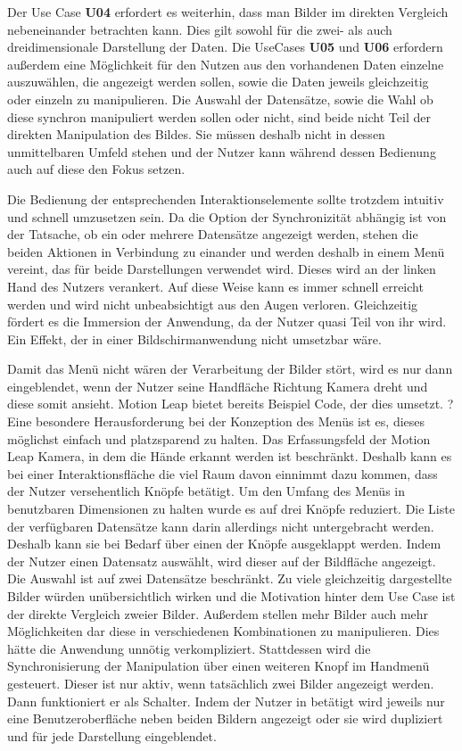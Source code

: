 Der Use Case \textbf{U04} erfordert es weiterhin, dass man Bilder im direkten Vergleich nebeneinander betrachten kann. Dies gilt sowohl für die zwei- als auch dreidimensionale Darstellung der Daten. Die UseCases \textbf{U05} und \textbf{U06} erfordern außerdem eine Möglichkeit für den Nutzen aus den vorhandenen Daten einzelne auszuwählen, die angezeigt werden sollen, sowie die Daten jeweils gleichzeitig oder einzeln zu manipulieren. 
Die Auswahl der Datensätze, sowie die Wahl ob diese synchron manipuliert werden sollen oder nicht, sind beide nicht Teil der direkten Manipulation des Bildes. Sie müssen deshalb nicht in dessen unmittelbaren Umfeld stehen und der Nutzer kann während dessen Bedienung auch auf diese den Fokus setzen.
 
Die Bedienung der entsprechenden Interaktionselemente sollte trotzdem intuitiv und schnell umzusetzen sein. Da die Option der Synchronizität abhängig ist von der Tatsache, ob ein oder mehrere Datensätze angezeigt werden, stehen die beiden Aktionen in Verbindung zu einander und werden deshalb in einem Menü vereint, das für beide Darstellungen verwendet wird. Dieses wird an der linken Hand des Nutzers verankert. Auf diese Weise kann es immer schnell erreicht werden und wird nicht unbeabsichtigt aus den Augen verloren. Gleichzeitig fördert es die Immersion der Anwendung, da der Nutzer quasi Teil von ihr wird. Ein Effekt, der in einer Bildschirmanwendung nicht umsetzbar wäre. 

Damit das Menü nicht wären der Verarbeitung der Bilder stört, wird es nur dann eingeblendet, wenn der Nutzer seine Handfläche Richtung Kamera dreht und diese somit ansieht. Motion Leap bietet bereits Beispiel Code, der dies umsetzt. ?
Eine besondere Herausforderung bei der Konzeption des Menüs ist es, dieses möglichst einfach und platzsparend zu halten. Das Erfassungsfeld der Motion Leap Kamera, in dem die Hände erkannt werden ist beschränkt. Deshalb kann es bei einer Interaktionsfläche die viel Raum davon einnimmt dazu kommen, dass der Nutzer versehentlich Knöpfe betätigt. 
Um den Umfang des Menüs in benutzbaren Dimensionen zu halten wurde es auf drei Knöpfe reduziert. 
Die Liste der verfügbaren Datensätze kann darin allerdings nicht untergebracht werden. Deshalb kann sie bei Bedarf über einen der Knöpfe ausgeklappt werden. 
Indem der Nutzer einen Datensatz auswählt, wird dieser auf der Bildfläche angezeigt. Die Auswahl ist auf zwei Datensätze beschränkt. Zu viele gleichzeitig dargestellte Bilder würden unübersichtlich wirken und die Motivation hinter dem Use Case ist der direkte Vergleich zweier Bilder. Außerdem stellen mehr Bilder auch mehr Möglichkeiten dar diese in verschiedenen Kombinationen zu manipulieren. Dies hätte die Anwendung unnötig verkompliziert. 
Stattdessen wird die Synchronisierung der Manipulation über einen weiteren Knopf im Handmenü gesteuert. Dieser ist nur aktiv, wenn tatsächlich zwei Bilder angezeigt werden. Dann funktioniert er als Schalter. Indem der Nutzer in betätigt wird jeweils nur eine Benutzeroberfläche neben beiden Bildern angezeigt oder sie wird dupliziert und für jede Darstellung eingeblendet. 
 
